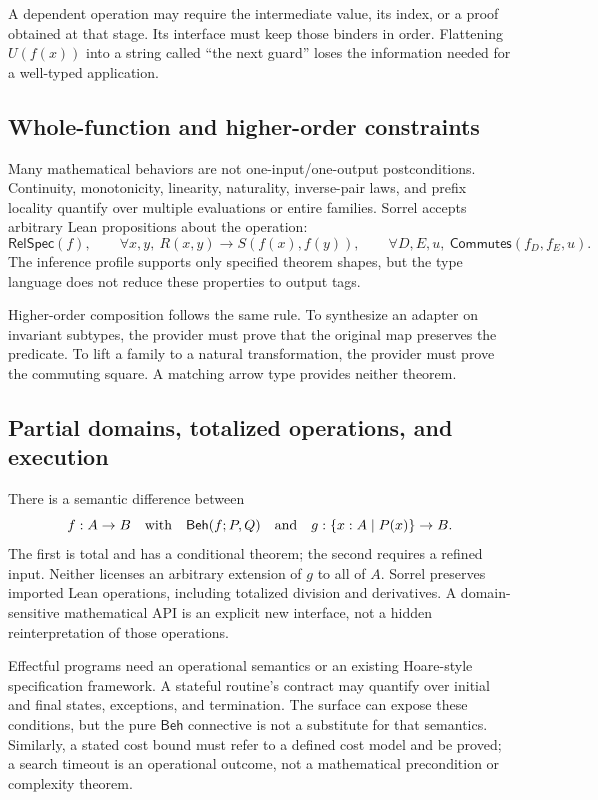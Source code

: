 \documentclass[11pt,a4paper]{article}
\newcommand{\Beh}{\mathsf{Beh}}\newcommand{\Min}{\operatorname{Min}}
\numberwithin{equation}{section}
\theoremstyle{definition}\newtheorem{definition}[theorem]{Definition}
\theoremstyle{remark}\newtheorem{remark}[theorem]{Remark}
\begin{document}
A dependent operation may require the intermediate value, its index, or a
proof obtained at that stage. Its interface must keep those binders in order.
Flattening \(U(f(x))\) into a string called ``the next guard'' loses the
information needed for a well-typed application.

\subsection{Whole-function and higher-order constraints}
Many mathematical behaviors are not one-input/one-output postconditions.
Continuity, monotonicity, linearity, naturality, inverse-pair laws, and prefix
locality quantify over multiple evaluations or entire families. Sorrel accepts
arbitrary Lean propositions about the operation:
\[
 \mathsf{RelSpec}(f),\qquad
 \forall x,y,\ R(x,y)\to S(f(x),f(y)),\qquad
 \forall D,E,u,\ \mathsf{Commutes}(f_D,f_E,u).
\]
The inference profile supports only specified theorem shapes, but the type
language does not reduce these properties to output tags.

Higher-order composition follows the same rule. To synthesize an adapter on
invariant subtypes, the provider must prove that the original map preserves
the predicate. To lift a family to a natural transformation, the provider must
prove the commuting square. A matching arrow type provides neither theorem.

\subsection{Partial domains, totalized operations, and execution}
There is a semantic difference between
\[
 f:A\to B\quad\hbox{with}\quad\Beh(f;P,Q)
 \quad\text{and}\quad
 g:\{x:A\mid P(x)\}\to B.
\]
The first is total and has a conditional theorem; the second requires a
refined input. Neither licenses an arbitrary extension of \(g\) to all of
\(A\). Sorrel preserves imported Lean operations, including totalized division
and derivatives. A domain-sensitive mathematical API is an explicit new
interface, not a hidden reinterpretation of those operations.

Effectful programs need an operational semantics or an existing Hoare-style
specification framework. A stateful routine's contract may quantify over
initial and final states, exceptions, and termination. The surface can expose
these conditions, but the pure \(\Beh\) connective is not a substitute for
that semantics. Similarly, a stated cost bound must refer to a defined cost
model and be proved; a search timeout is an operational outcome, not a
mathematical precondition or complexity theorem.
\end{document}

